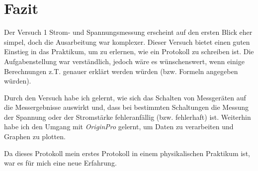 \documentclass[10pt,a4paper]{article}
\newcommand{\vnr}{1}
\begin{document}
\section{Fazit}
\begin{flushleft}
Der Versuch \vnr \hspace{1pt} \glqq Strom- und Spannungsmessung\grqq\hspace{1pt} erscheint auf den ersten Blick eher simpel, doch die Ausarbeitung war komplexer. Dieser Versuch bietet einen guten Einstieg in das Praktikum, um zu erlernen, wie ein Protokoll zu schreiben ist. Die Aufgabenstellung war verständlich, jedoch wäre es wünschenswert, wenn einige Berechnungen z.T. genauer erklärt werden würden (bzw. Formeln angegeben würden).

Durch den Versuch habe ich gelernt, wie sich das Schalten von Messgeräten auf die Messergebnisse auswirkt und, dass bei bestimmten Schaltungen die Messung der Spannung oder der Stromstärke fehleranfällig (bzw. fehlerhaft) ist. Weiterhin habe ich den Umgang mit \textit{OriginPro} gelernt, um Daten zu verarbeiten und Graphen zu plotten.

Da dieses Protokoll mein erstes Protokoll in einem physikalischen Praktikum ist, war es für mich eine neue Erfahrung.
\end{flushleft}

\begingroup
\raggedright
\sloppy
\printbibliography[heading=bibintoc,title={6 \hspace{6pt} Literatur}]
\endgroup
\end{document}
